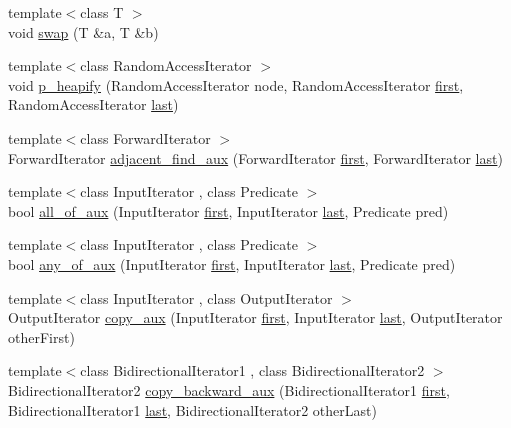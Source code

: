 \begin{DoxyCompactItemize}
\item 
{\footnotesize template$<$class T $>$ }\\void \hyperlink{namespaceprism_a6430516ab4f2e2a7f43323acb6b559d8}{swap} (T \&a, T \&b)
\item 
{\footnotesize template$<$class Random\+Access\+Iterator $>$ }\\void \hyperlink{namespaceprism_a5f2c83ae0d89a6581d1c42ba6fd79de0}{p\+\_\+heapify} (Random\+Access\+Iterator node, Random\+Access\+Iterator \hyperlink{namespaceprism_ae3fb7a1926a9e8e59300cd5e370470da}{first}, Random\+Access\+Iterator \hyperlink{namespaceprism_abe4956c4e865f55ca126b7fb973b5078}{last})
\item 
{\footnotesize template$<$class Forward\+Iterator $>$ }\\Forward\+Iterator \hyperlink{namespaceprism_a6b26c227e2d379b9d934a85a2570bae7}{adjacent\+\_\+find\+\_\+aux} (Forward\+Iterator \hyperlink{namespaceprism_ae3fb7a1926a9e8e59300cd5e370470da}{first}, Forward\+Iterator \hyperlink{namespaceprism_abe4956c4e865f55ca126b7fb973b5078}{last})
\item 
{\footnotesize template$<$class Input\+Iterator , class Predicate $>$ }\\bool \hyperlink{namespaceprism_adee0c5bacf315d8cfdc4de7151ba2295}{all\+\_\+of\+\_\+aux} (Input\+Iterator \hyperlink{namespaceprism_ae3fb7a1926a9e8e59300cd5e370470da}{first}, Input\+Iterator \hyperlink{namespaceprism_abe4956c4e865f55ca126b7fb973b5078}{last}, Predicate pred)
\item 
{\footnotesize template$<$class Input\+Iterator , class Predicate $>$ }\\bool \hyperlink{namespaceprism_aae3105c7afbb375201f4691b7ea966b4}{any\+\_\+of\+\_\+aux} (Input\+Iterator \hyperlink{namespaceprism_ae3fb7a1926a9e8e59300cd5e370470da}{first}, Input\+Iterator \hyperlink{namespaceprism_abe4956c4e865f55ca126b7fb973b5078}{last}, Predicate pred)
\item 
{\footnotesize template$<$class Input\+Iterator , class Output\+Iterator $>$ }\\Output\+Iterator \hyperlink{namespaceprism_a8fc5dc440a705fbe80912a49ea6d899b}{copy\+\_\+aux} (Input\+Iterator \hyperlink{namespaceprism_ae3fb7a1926a9e8e59300cd5e370470da}{first}, Input\+Iterator \hyperlink{namespaceprism_abe4956c4e865f55ca126b7fb973b5078}{last}, Output\+Iterator other\+First)
\item 
{\footnotesize template$<$class Bidirectional\+Iterator1 , class Bidirectional\+Iterator2 $>$ }\\Bidirectional\+Iterator2 \hyperlink{namespaceprism_af94bcd5517145cc7b62c59a84a776814}{copy\+\_\+backward\+\_\+aux} (Bidirectional\+Iterator1 \hyperlink{namespaceprism_ae3fb7a1926a9e8e59300cd5e370470da}{first}, Bidirectional\+Iterator1 \hyperlink{namespaceprism_abe4956c4e865f55ca126b7fb973b5078}{last}, Bidirectional\+Iterator2 other\+Last)

\end{DoxyCompactItemize}
